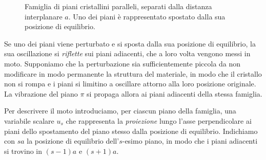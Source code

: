 \begin{figure}[htbp]
    \centering
    \caption{Famiglia di piani cristallini paralleli, separati dalla distanza interplanare \( a \). Uno dei piani è rappresentato spostato dalla sua posizione di equilibrio.}
    \label{fig:piani_cristallini_vibrazioni}
\end{figure}

Se uno dei piani viene perturbato e si sposta dalla sua posizione di equilibrio, la sua oscillazione si \emph{riflette} sui piani adiacenti, che a loro volta vengono messi in moto. Supponiamo che la perturbazione sia sufficientemente piccola da non modificare in modo permanente la struttura del materiale, in modo che il cristallo non si rompa e i piani si limitino a oscillare attorno alla loro posizione originale. La vibrazione del piano \( \pi \) si propaga allora ai piani adiacenti della stessa famiglia.

Per descrivere il moto introduciamo, per ciascun piano della famiglia, una variabile scalare \( u_s \) che rappresenta la \emph{proiezione} lungo l'asse perpendicolare ai piani dello spostamento del piano stesso dalla posizione di equilibrio. Indichiamo con \( sa \) la posizione di equilibrio dell'\( s \)-esimo piano, in modo che i piani adiacenti si trovino in \( (s-1)a \) e \( (s+1)a \).

